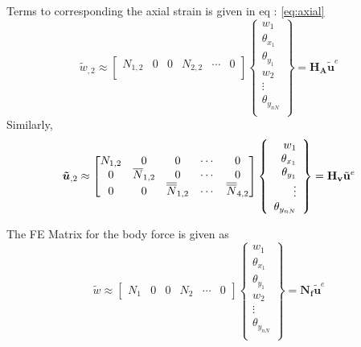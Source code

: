 \documentclass[main.tex]{subfiles}
\begin{document}
Terms to corresponding the axial strain is given in eq : \ref{eq:axial}
\begin{equation}\label{eq:axial}
\tilde{w}_{,2}  \approx
\begin{bmatrix}
{N}_{1,2} & 0 & 0 &{N}_{2,2} & \cdots & 0 \\ 
\end{bmatrix} 
\left\{
\begin{array}{r}
w_1 \\
\theta_{x_1} \\
\theta_{y_1} \\
w_{2} \\
\vdots \\
\theta_{y_{nN}} \\
\end{array} \right\}=\mathbf{ H_A }\tilde{\mathbf{u}}^e
\end{equation}
Similarly,
\begin{equation}
\boldsymbol{\tilde{u}}_{,2}  \approx
\begin{bmatrix}
{N}_{1,2} & 0 & 0 & \cdots & 0 \\
0 & \overline{N}_{1,2} & 0 & \cdots & 0 \\ 
0 & 0 & \overline{\overline{N}}_{1,2} & \cdots & \overline{\overline{N}}_{4,2} \\ 
\end{bmatrix} 
\left\{
\begin{array}{r}
w_1 \\
\theta_{x_1} \\
\theta_{y_1} \\
\vdots \\
\theta_{y_{nN}} \\
\end{array} \right\}=\mathbf{ H_v }\tilde{\mathbf{u}}^e
\end{equation}



The FE Matrix for the body force is given as
\begin{equation}
\tilde{w}  \approx
\begin{bmatrix}
{N}_{1} & 0 & 0 &{N}_{2} &\cdots & 0 
\end{bmatrix} 
\left\{
\begin{array}{r}
w_1 \\
\theta_{x_1} \\
\theta_{y_1} \\
w_2 \\
\vdots \\
\theta_{y_{nN}} \\
\end{array} \right\}=\mathbf{ N_f }\tilde{\mathbf{u}}^e
\end{equation}
\end{document}
